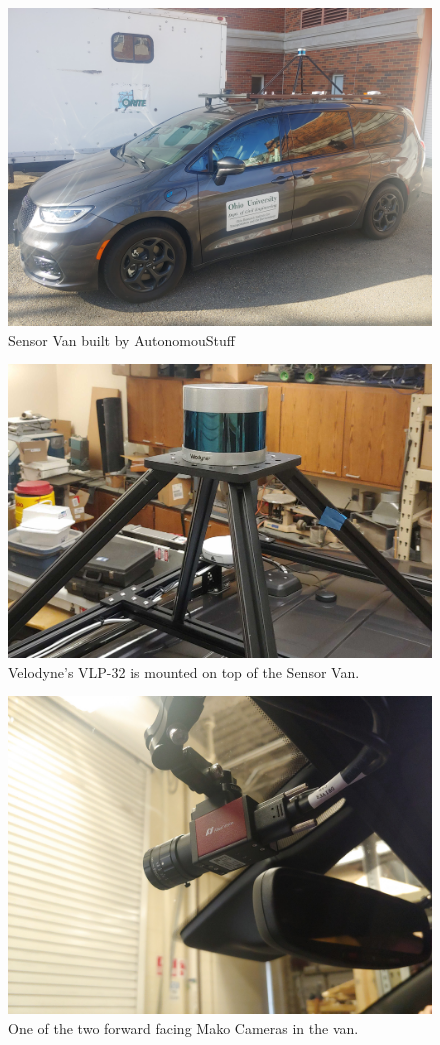 \documentclass[numbered,pdftex]{ohio-etd}
\begin{document}
{{{{				\begin{figure}[H]
					\centering
					\includegraphics[width=0.7\linewidth]{Defense_Images/van_on_van}
					\caption[Sensor Van]{Sensor Van built by AutonomouStuff}
					\label{fig:Experimental_Apperatus}
				\end{figure}
			
				\begin{figure}[H]
					\centering
					\includegraphics[width=0.7\linewidth]{Defense_Images/vlp_32_mount_2}
					\caption[VLP 32 on Van]{Velodyne's VLP-32 is mounted on top of the Sensor Van.}
					\label{fig:vlp32mount}
				\end{figure}
				
				\begin{figure}[H]
					\centering
					\includegraphics[width=0.7\linewidth]{Defense_Images/Mako_Camera}
					\caption[Mako Camera]{One of the two forward facing Mako Cameras in the van.}
					\label{fig:makocamera}
				\end{figure}
			
}}}}
\end{document}
